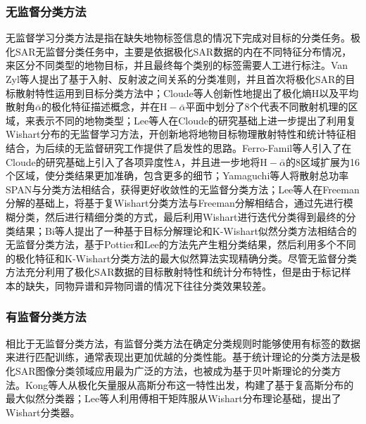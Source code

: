 \subsubsection{无监督分类方法}
无监督学习分类方法是指在缺失地物标签信息的情况下完成对目标的分类任务。极化SAR无监督分类任务中，主要是依据极化SAR数据的内在不同特征分布情况，来区分不同类型的地物目标，并且最终每个类别的标签需要人工进行标注。Van Zyl等人提出了基于入射、反射波之间关系的分类准则，并且首次将极化SAR的目标散射特性运用到目标分类方法中\citing{}；Cloude等人创新性地提出了极化熵$\mathrm{H}$以及平均散射角$\bar{\alpha}$的极化特征描述概念，并在$\mathrm{H}-\bar{\alpha}$平面中划分了8个代表不同散射机理的区域，来表示不同的地物类型\citing{}；Lee等人在Cloude的研究基础上进一步提出了利用复Wishart分布的无监督学习方法，开创新地将地物目标物理散射特性和统计特征相结合，为后续的无监督研究工作提供了启发性的思路\citing{}。Ferro-Famil等人引入了在Cloude的研究基础上引入了各项异度性$\mathrm{A}$，并且进一步地将$\mathrm{H}-\bar{\alpha}$的8区域扩展为16个区域，使分类结果更加准确，包含更多的细节\citing{}；Yamaguchi等人将散射总功率SPAN与分类方法相结合，获得更好收敛性的无监督分类方法\citing{}；Lee等人在Freeman分解的基础上，将基于复Wishart分类方法与Freeman分解相结合，通过先进行模糊分类，然后进行精细分类的方式，最后利用Wishart进行迭代分类得到最终的分类结果\citing{}；Bi等人提出了一种基于目标分解理论和K-Wishart似然分类方法相结合的无监督分类方法，基于Pottier和Lee\citing{}的方法先产生粗分类结果，然后利用多个不同的极化特征和K-Wishart分类方法的最大似然算法实现精确分类\citing{}。尽管无监督分类方法充分利用了极化SAR数据的目标散射特性和统计分布特性，但是由于标记样本的缺失，同物异谱和异物同谱的情况下往往分类效果较差。

\subsubsection{有监督分类方法}
相比于无监督分类方法，有监督分类方法在确定分类规则时能够使用有标签的数据来进行匹配训练，通常表现出更加优越的分类性能。基于统计理论的分类方法是极化SAR图像分类领域应用最为广泛的方法，也被成为基于贝叶斯理论的分类方法。Kong等人从极化矢量服从高斯分布这一特性出发，构建了基于复高斯分布的最大似然分类器\citing{}；Lee等人利用傅相干矩阵服从Wishart分布理论基础，提出了Wishart分类器\citing{}。

